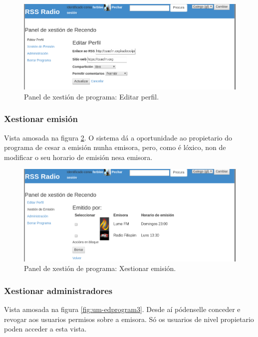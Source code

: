 \begin{figure}[h]
	\centering
	\includegraphics[scale=0.43,keepaspectratio=true]{./images/usermanual/um-edprogram1.png}
	\caption{Panel de xestión de programa: Editar perfil.}
	\label{fig:um-edprogram1}
\end{figure}

\subsubsection{Xestionar emisión}

Vista amosada na figura \ref{fig:um-edprogram2}. O sistema dá a oportunidade ao propietario do programa de cesar a emisión nunha emisora, pero, como é lóxico, non de modificar o seu horario de emisión nesa emisora. 

\begin{figure}[h]
	\centering
	\includegraphics[scale=0.43,keepaspectratio=true]{./images/usermanual/um-edprogram2.png}
	\caption{Panel de xestión de programa: Xestionar emisión.}
	\label{fig:um-edprogram2}
\end{figure}

\subsubsection{Xestionar administradores}

Vista amosada na figura \ref{fig:um-edprogram3}. Desde aí pódenselle conceder e revogar aos usuarios permisos sobre a emisora. Só os usuarios de nivel propietario poden acceder a esta vista. 

